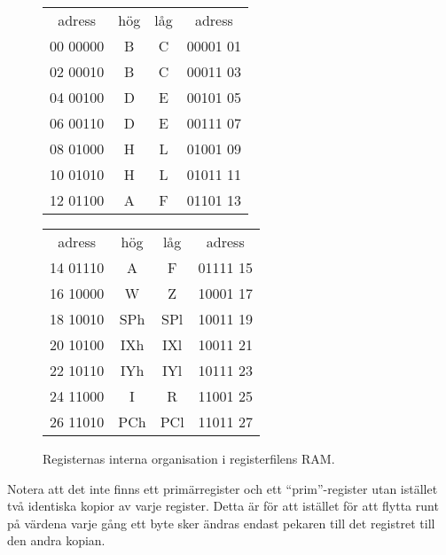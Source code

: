 \documentclass[main.tex]{subfiles}
\begin{document}
\begin{figure}[b]
    \center
    \ttfamily\arraybackslash
    \begin{tabular}{r|c|c|l}
        \multicolumn{1}{c}{adress} &
        \multicolumn{1}{c}{hög} & \multicolumn{1}{c}{låg} &
        \multicolumn{1}{c}{adress} \\ \cline{2-3}
        00 00000 & B   & C   & 00001 01 \\ \cline{2-3}
        02 00010 & B   & C   & 00011 03 \\ \cline{2-3}
        04 00100 & D   & E   & 00101 05 \\ \cline{2-3}
        06 00110 & D   & E   & 00111 07 \\ \cline{2-3}
        08 01000 & H   & L   & 01001 09 \\ \cline{2-3}
        10 01010 & H   & L   & 01011 11 \\ \cline{2-3}
        12 01100 & A   & F   & 01101 13 \\ \cline{2-3}
    \end{tabular}
    \begin{tabular}{r|c|c|l}
        \multicolumn{1}{c}{adress} &
        \multicolumn{1}{c}{hög} & \multicolumn{1}{c}{låg} &
        \multicolumn{1}{c}{adress} \\ \cline{2-3}
        14 01110 & A   & F   & 01111 15 \\ \cline{2-3}
        16 10000 & W   & Z   & 10001 17 \\ \cline{2-3}
        18 10010 & SPh & SPl & 10011 19 \\ \cline{2-3}
        20 10100 & IXh & IXl & 10011 21 \\ \cline{2-3}
        22 10110 & IYh & IYl & 10111 23 \\ \cline{2-3}
        24 11000 & I   & R   & 11001 25 \\ \cline{2-3}
        26 11010 & PCh & PCl & 11011 27 \\ \cline{2-3}
    \end{tabular}
    \caption{Registernas interna organisation i registerfilens RAM.}
    \label{fig:rfint}
\end{figure}

Notera att det inte finns ett primärregister och ett ``prim''-register utan
istället två identiska kopior av varje register. Detta är för att istället för
att flytta runt på värdena varje gång ett byte sker ändras endast pekaren
till det registret till den andra kopian.
\end{document}
